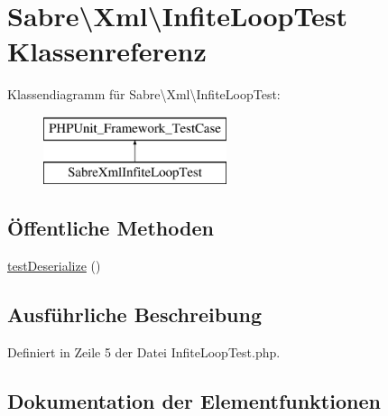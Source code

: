\hypertarget{class_sabre_1_1_xml_1_1_infite_loop_test}{}\section{Sabre\textbackslash{}Xml\textbackslash{}Infite\+Loop\+Test Klassenreferenz}
\label{class_sabre_1_1_xml_1_1_infite_loop_test}
Klassendiagramm für Sabre\textbackslash{}Xml\textbackslash{}Infite\+Loop\+Test\+:\begin{figure}[H]
\begin{center}
\leavevmode
\includegraphics[height=2.000000cm]{class_sabre_1_1_xml_1_1_infite_loop_test}
\end{center}
\end{figure}
\subsection*{Öffentliche Methoden}
\begin{DoxyCompactItemize}
\item 
\mbox{\hyperlink{class_sabre_1_1_xml_1_1_infite_loop_test_a018c4f3e776a924bf5b65c0368b7ed83}{test\+Deserialize}} ()
\end{DoxyCompactItemize}


\subsection{Ausführliche Beschreibung}


Definiert in Zeile 5 der Datei Infite\+Loop\+Test.\+php.



\subsection{Dokumentation der Elementfunktionen}
\mbox{\label{class_sabre_1_1_xml_1_1_infite_loop_test_a018c4f3e776a924bf5b65c0368b7ed83}} 
